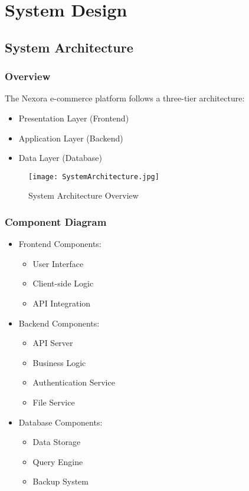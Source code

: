 \chapter{System Design}

\section{System Architecture}
\subsection{Overview}
The Nexora e-commerce platform follows a three-tier architecture:
\begin{itemize}
    \item Presentation Layer (Frontend)
    \item Application Layer (Backend)
    \item Data Layer (Database)
\end{itemize}

\begin{figure}[h]
    \centering
    \texttt{[image: SystemArchitecture.jpg]}
    \caption{System Architecture Overview}
    \label{fig:system-architecture}
\end{figure}

\subsection{Component Diagram}
\begin{itemize}
    \item Frontend Components:
    \begin{itemize}
        \item User Interface
        \item Client-side Logic
        \item API Integration
    \end{itemize}
    \item Backend Components:
    \begin{itemize}
        \item API Server
        \item Business Logic
        \item Authentication Service
        \item File Service
    \end{itemize}
    \item Database Components:
    \begin{itemize}
        \item Data Storage
        \item Query Engine
        \item Backup System
    \end{itemize}
\end{itemize}


